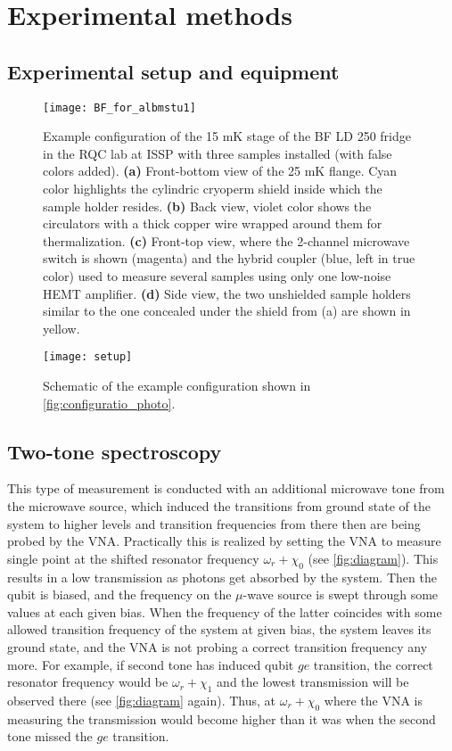 \documentclass[12pt, twoside]{report}
\numberwithin{equation}{section}
\begin{document}
\chapter{Experimental methods}

\section{Experimental setup and equipment}


\begin{figure}[h!]
\centering
\texttt{[image: BF\_for\_albmstu1]}
\caption{Example configuration of the 15 mK stage of the BF LD 250 fridge in the RQC lab at ISSP with three samples installed (with false colors added). \textbf{(a)} Front-bottom view of the 25 mK flange. Cyan color highlights the cylindric cryoperm shield inside which the sample holder resides. \textbf{(b)} Back view, violet color shows the circulators with  a thick copper wire wrapped around them for thermalization. \textbf{(c)} Front-top view, where the 2-channel  microwave switch is shown (magenta) and the hybrid coupler (blue, left in true color) used to measure several samples using only one low-noise HEMT amplifier. \textbf{(d)} Side view, the two unshielded sample holders similar to the one concealed under the shield from (a) are shown in yellow.}
\label{fig:configuratio_photo}
\end{figure}

\begin{figure}[h!]
\centering
\texttt{[image: setup]}
\caption{Schematic of the example configuration shown in \autoref{fig:configuratio_photo}.}
\end{figure}

\section{Two-tone spectroscopy}
\label{sec:2tone}

This type of measurement is conducted with an additional microwave tone from the microwave source, which induced the transitions from ground state of the system to higher levels and transition frequencies from there then are being probed by the VNA. Practically this is realized by setting the VNA to measure single point at the shifted resonator  frequency $\omega_r + \chi_0$ (see \autoref{fig:diagram}). This results in a low transmission as photons get absorbed by the system. Then the qubit is biased, and the frequency on the $\mu$-wave source is swept through some values at each given bias. When the frequency of the latter coincides with some allowed transition frequency of the system at given bias, the system leaves its ground state, and the VNA is not probing a correct transition frequency any more. For example, if second tone has induced qubit $ge$ transition, the correct resonator frequency would be $\omega_r + \chi_1$ and the lowest transmission will be observed there (see \autoref{fig:diagram} again). Thus, at $\omega_r + \chi_0$ where the VNA is measuring the transmission would become higher than it was when the second tone missed the $ge$ transition. 
\end{document}
